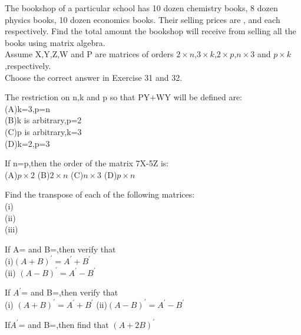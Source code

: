 \item The bookshop of a particular school has 10 dozen chemistry books, 8 dozen
physics books, 10 dozen economics books. Their selling prices are ,  and
  each respectively. Find the total amount the bookshop will receive from
selling all the books using matrix algebra.\\
Assume X,Y,Z,W and P are matrices of orders $2\times n$,$3 \times k$,$2\times p$,$n\times 3$ and $p\times k$,respectively.\\
Choose the correct answer in Exercise 31 and 32.\\
\item The restriction on n,k and p so that PY+WY will be defined are:\\
(A)k=3,p=n\\
 (B)k is arbitrary,p=2 \\
 (C)p is arbitrary,k=3 \\
 (D)k=2,p=3\\
\item If n=p,then the order of the matrix 7X-5Z is:\\
(A)$p \times 2$ (B)$2 \times n$ (C)$n \times 3$ (D)$p \times n$\\
\item Find the transpose of each of the following matrices:\\
(i)\\ (ii)\\ (iii)\\
\item If A= and B=,then verify that\\
(i)$(A+B)^{'}=A^{'}+B^{'}$ \\(ii) $(A-B)^{'}=A^{'}-B^{'}$\\
\item If $A^{'}$= and B=,then verify that\\
(i) $(A+B)^{'}=A^{'}+B^{'}$ (ii)$(A-B)^{'}=A^{'}-B^{'}$
\item If$ A^{'}$= and B=,then find that $(A+2B)^{'}$\\


